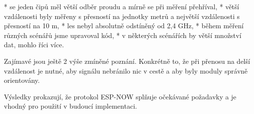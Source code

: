 \begitems
* se jeden čipů měl větší odběr proudu a mírně se při měření přehříval,
* větší vzdálenosti byly měřeny s přesností na jednotky metrů a největší vzdálenosti s přesností na 10 m,
* les nebyl absolutně odstíněný od 2,4 GHz,
* během měření různých scénářů jsme upravoval kód,
* v některých scénářích by větší množství dat, mohlo říci více.

Zajímavé jsou ještě 2 výše zmíněné poznání. Konkrétně to, že při přenosu na delší vzdálenost je nutné, aby signálu nebránilo nic v cestě a aby byly moduly správně orientovány.

Výsledky prokazují, že protokol ESP-NOW splňuje očekávané požadavky a je vhodný pro použití v budoucí implementaci.
